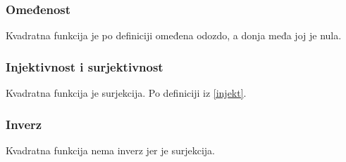 \subsubsection{Omeđenost \aps}
    Kvadratna funkcija je po definiciji omeđena odozdo, a donja međa joj je nula.

\subsubsection{Injektivnost i surjektivnost \aps}
    Kvadratna funkcija je surjekcija. Po definiciji iz \ref{injekt}.

\subsubsection{Inverz \aps}
    Kvadratna funkcija nema inverz jer je surjekcija.